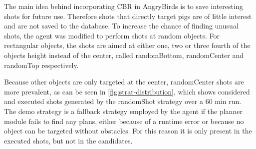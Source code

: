 The main idea behind incorporating CBR in AngryBirds is to save interesting shots for future use. Therefore shots that directly target pigs are of little interest and are not saved to the database.
To increase the chance of finding unusual shots, the agent was modified to perform shots at random objects. For rectangular objects, the shots are aimed at either one, two or three fourth of the objects height instead of the center, called randomBottom, randomCenter and randomTop respectively.

Because other objects are only targeted at the center, randomCenter shots are more prevalent, as can be seen in \ref{fig:strat-distribution}, which shows considered and executed shots generated by the randomShot strategy over a 60 min run.
The demo strategy is a fallback strategy employed by the agent if the planner module fails to find any plans, either because of a runtime error or because no object can be targeted without obstacles. For this reason it is only present in the executed shots, but not in the candidates.


